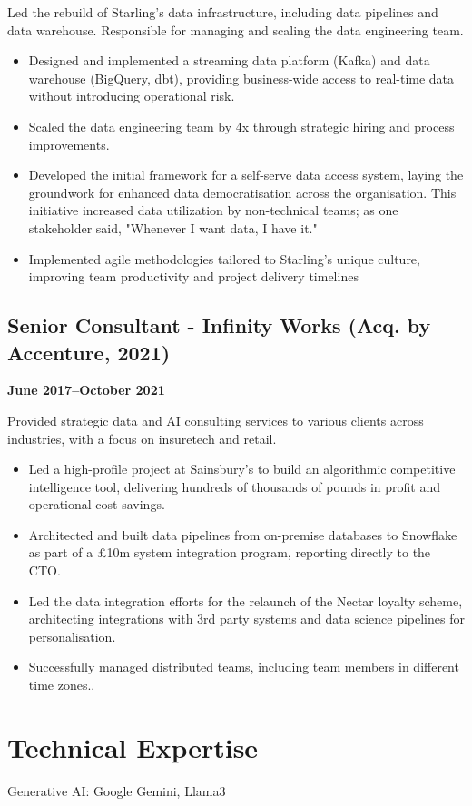 \documentclass[a4paper]{scrartcl}
\begin{document}
Led the rebuild of Starling's data infrastructure, including data pipelines and data warehouse. Responsible for managing and scaling the data engineering team.
\begin{itemize}
	\item Designed and implemented a streaming data platform (Kafka) and data warehouse (BigQuery, dbt), providing business-wide access to real-time data without introducing operational risk.
	\item Scaled the data engineering team by 4x through strategic hiring and process improvements.
	\item Developed the initial framework for a self-serve data access system, laying the groundwork for enhanced data democratisation across the organisation. This initiative increased data utilization by non-technical teams; as one stakeholder said, "Whenever I want data, I have it."
	\item Implemented agile methodologies tailored to Starling's unique culture, improving team productivity and project delivery timelines
\end{itemize}

\subsection*{Senior Consultant - Infinity Works (Acq. by Accenture, 2021)}
\textbf{June 2017--October 2021}

Provided strategic data and AI consulting services to various clients across industries, with a focus on insuretech and retail.
\begin{itemize}
	\item Led a high-profile project at Sainsbury's to build an algorithmic competitive intelligence tool, delivering hundreds of thousands of pounds in profit and operational cost savings.
	\item Architected and built data pipelines from on-premise databases to Snowflake as part of a £10m system integration program, reporting directly to the CTO.
	\item Led the data integration efforts for the relaunch of the Nectar loyalty scheme, architecting integrations with 3rd party systems and data science pipelines for personalisation.
	\item Successfully managed distributed teams, including team members in different time zones..
\end{itemize}

\section*{Technical Expertise}
Generative AI: Google Gemini, Llama3
\end{document}
